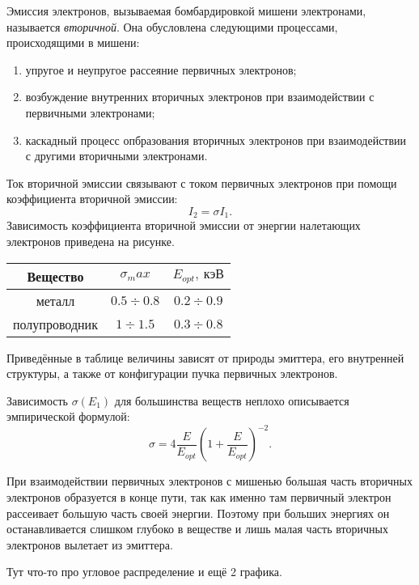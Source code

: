 Эмиссия электронов, вызываемая бомбардировкой мишени электронами, называется
\emph{вторичной}. Она обусловлена следующими процессами, происходящими в мишени:
\begin{enumerate}
    \item упругое и неупругое рассеяние первичных электронов;
    \item возбуждение внутренних вторичных электронов при взаимодействии с
    первичными электронами;
    \item каскадный процесс опбразования вторичных электронов при взаимодействии
    с другими вторичными электронами.
\end{enumerate}
Ток вторичной эмиссии связывают с током первичных электронов при помощи
коэффициента вторичной эмиссии:
\[
    I_2 = \sigma I_1.
\]
Зависимость коэффициента вторичной эмиссии от энергии налетающих электронов
приведена на рисунке.
\begin{table}[h]
    \center
    \begin{tabular}{|c|c|c|} \hline
        Вещество      & $\sigma_max$ & $E_{opt},~\text{кэВ}$ \\ \hline
        металл        & $0.5\div0.8$ & $ 0.2\div0.9 $ \\
        полупроводник & $1\div1.5$   & $ 0.3\div0.8 $ \\ \hline
    \end{tabular}
\end{table}
Приведённые в таблице величины зависят от природы эмиттера, его внутренней
структуры, а также от конфигурации пучка первичных электронов.

Зависимость \( \sigma(E_1) \) для большинства веществ неплохо описывается
эмпирической формулой:
\[
    \sigma = 4\frac{E}{E_{opt}}\left(1+\frac{E}{E_{opt}}\right)^{-2}.
\]

При взаимодействии первичных электронов с мишенью большая часть вторичных
электронов образуется в конце пути, так как именно там первичный электрон
рассеивает большую часть своей энергии. Поэтому при больших энергиях он
останавливается слишком глубоко в веществе и лишь малая часть вторичных
электронов вылетает из эмиттера.

Тут что-то про угловое распределение и ещё 2 графика.


